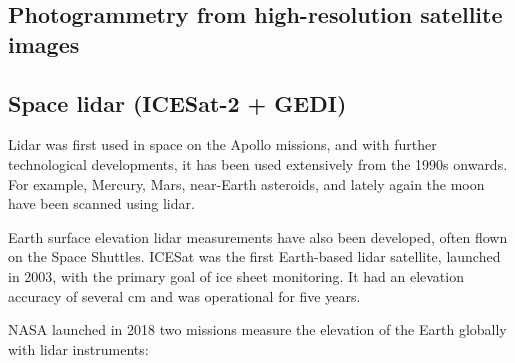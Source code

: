 \subsection{Photogrammetry from high-resolution satellite images}


\subsection{Space lidar (ICESat-2 + GEDI)}

Lidar was first used in space on the Apollo missions, and with further technological developments, it has been used extensively from the 1990s onwards.
For example, Mercury, Mars, near-Earth asteroids, and lately again the moon have been scanned using lidar.

%

Earth surface elevation lidar measurements have also been developed, often flown on the Space Shuttles.
ICESat was the first Earth-based lidar satellite, launched in 2003, with the primary goal of ice sheet monitoring.
It had an elevation accuracy of several cm and was operational for five years.

%

NASA launched in 2018 two missions measure the elevation of the Earth globally with lidar instruments: 

